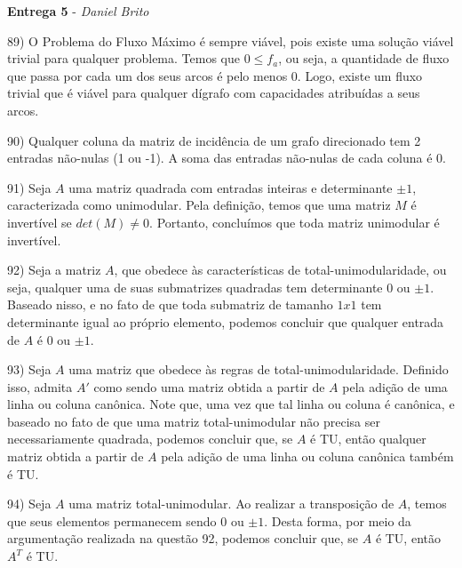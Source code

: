 \documentclass[]{article}
\begin{document}
\begin{center}
  \Large\textbf{Entrega 5} - \Large\textit{Daniel Brito}
\end{center}

89) O Problema do Fluxo Máximo é sempre viável, pois existe uma solução viável trivial para qualquer problema. Temos que $0 \leq f_a$, ou seja, a quantidade de fluxo que passa por cada um dos seus arcos é pelo menos 0. Logo, existe um fluxo trivial que é viável para qualquer dígrafo com capacidades atribuídas a seus arcos.

\vspace{0.5cm}

90) Qualquer coluna da matriz de incidência de um grafo direcionado tem 2 entradas não-nulas (1 ou -1). A soma das entradas não-nulas de cada coluna é 0.

\vspace{0.5cm}

91) Seja $A$ uma matriz quadrada com entradas inteiras e determinante $\pm 1$, caracterizada como unimodular. Pela definição, temos que uma matriz $M$ é invertível se $det(M) \neq 0$. Portanto, concluímos que toda matriz unimodular é invertível.

\vspace{0.5cm}

92) Seja a matriz $A$, que obedece às características de total-unimodularidade, ou seja, qualquer uma de suas submatrizes quadradas tem determinante 0 ou $\pm 1$. Baseado nisso, e no fato de que toda submatriz de tamanho $1x1$ tem determinante igual ao próprio elemento, podemos concluir que qualquer entrada de $A$ é 0 ou $\pm 1$.

\vspace{0.5cm}

93) Seja $A$ uma matriz que obedece às regras de total-unimodularidade. Definido isso, admita $A'$ como sendo uma matriz obtida a partir de $A$ pela adição de uma linha ou coluna canônica. Note que, uma vez que tal linha ou coluna é canônica, e baseado no fato de que uma matriz total-unimodular não precisa ser necessariamente quadrada, podemos concluir que, se $A$ é TU, então qualquer matriz obtida a partir de $A$ pela adição de uma linha ou coluna canônica também é TU.

\vspace{0.5cm}

94) Seja $A$ uma matriz total-unimodular. Ao realizar a transposição de $A$, temos que seus elementos permanecem sendo 0 ou $\pm 1$. Desta forma, por meio da argumentação realizada na questão 92, podemos concluir que, se $A$ é TU, então $A^T$ é TU.
\end{document}
